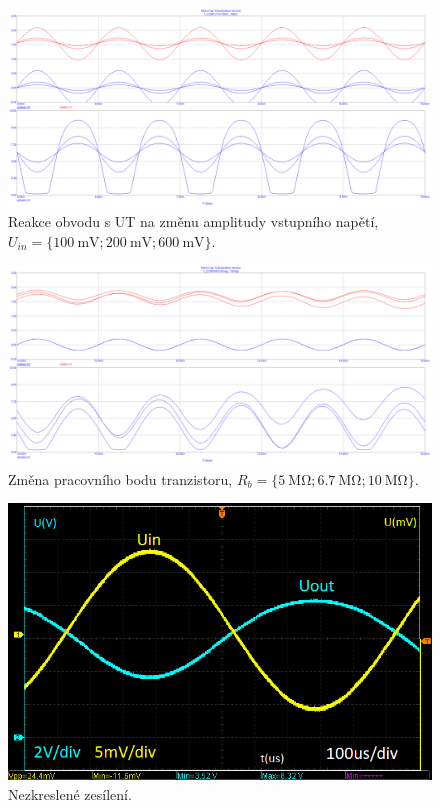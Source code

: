 \documentclass{protokol}
\begin{document}
	\begin{figure}[h!]
		\centering
		\includegraphics[width=\textwidth]{microcap/xFET/Prubehy_2_100mV-600mV.png}
		\centering
		\caption{Reakce obvodu s UT na změnu amplitudy vstupního napětí,  $ U_{in}= \{\SI{100}{\milli\volt};\SI{200}{\milli\volt};\SI{600}{\milli\volt}\} $.}
		\label{fig:-mc_}
	\end{figure}
	
	\begin{figure}[h!]
		\centering
		\includegraphics[width=\textwidth]{microcap/xFET/Prubehy_2_RB_5M-10M.png}
		\centering
		\caption{Změna pracovního bodu tranzistoru, $ R_{b}= \{\SI{5}{\mega\ohm};\SI{6.7}{\mega\ohm};\SI{10}{\mega\ohm}\} $.}
		\label{fig:-mc_}
	\end{figure}
	
	
	\begin{figure}[h!]
		\centering
		\includegraphics[width=\textwidth]{oscilo/1done.png}
		\centering
		\caption{Nezkreslené zesílení.}
		\label{fig:-osc_}
	\end{figure}
	
\end{document}
